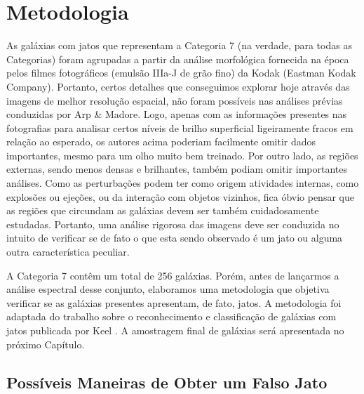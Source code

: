 
\chapter{Metodologia}

As galáxias com jatos que representam a Categoria 7 (na verdade, para todas as Categorias) foram agrupadas a partir da análise morfológica fornecida na época pelos filmes fotográficos (emulsão IIIa-J de grão fino) da Kodak (Eastman Kodak Company). Portanto, certos detalhes que conseguimos explorar hoje através das imagens de melhor resolução espacial, não foram possíveis nas análises prévias conduzidas por Arp \& Madore. Logo, apenas com as informações presentes nas fotografias para analisar certos níveis de brilho superficial ligeiramente fracos em relação ao esperado, os autores acima poderiam facilmente omitir dados importantes, mesmo para um olho muito bem treinado. Por outro lado, as regiões externas, sendo menos densas e brilhantes, também podiam omitir importantes análises. Como as perturbações podem ter como origem atividades internas, como explosões ou ejeções, ou da interação com objetos vizinhos, fica óbvio pensar que as regiões que circundam as galáxias devem ser também cuidadosamente estudadas. Portanto, uma análise rigorosa das imagens deve ser conduzida no intuito de verificar se de fato o que esta sendo observado é um jato ou alguma outra característica peculiar.

A Categoria 7 contêm um total de 256 galáxias. Porém, antes de lançarmos a análise espectral desse conjunto, elaboramos uma metodologia que objetiva verificar se as galáxias presentes apresentam, de fato, jatos. A metodologia foi adaptada do trabalho sobre o reconhecimento e classificação de galáxias com jatos publicada por Keel \cite{keel1985recognition}. A amostragem final de galáxias será apresentada no próximo Capítulo.

\section{Possíveis Maneiras de Obter um Falso Jato}

